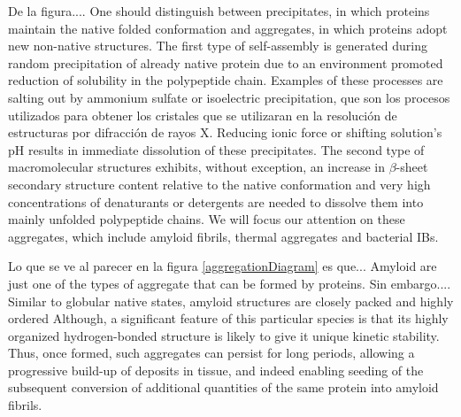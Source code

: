 De la figura....
One should distinguish between precipitates, in which proteins maintain the native folded conformation and aggregates, in which proteins adopt new non-native structures. 
The first type of self-assembly is generated during random precipitation of already native protein due to an environment promoted reduction of solubility in the polypeptide chain. 
Examples of these processes are salting out by ammonium sulfate or isoelectric precipitation, que son los procesos utilizados para obtener los cristales que se utilizaran en la resolución de estructuras por difracción de rayos X. 
Reducing ionic force or shifting solution's pH results in immediate dissolution of these precipitates. 
The second type of macromolecular structures exhibits, without exception, an increase in $\beta$-sheet secondary structure content relative to the native conformation and
very high concentrations of denaturants or detergents are needed to dissolve them into mainly unfolded polypeptide chains. 
We will focus our attention on these aggregates, which include amyloid fibrils, thermal aggregates and bacterial IBs. 








Lo que se ve al parecer en la figura \ref{aggregationDiagram} es que...
Amyloid are just one of the types of aggregate that
can be formed by proteins.
Sin embargo....
Similar to globular native states, amyloid structures are closely packed and highly ordered
Although, a significant feature of this particular species is that its highly organized hydrogen-bonded structure is likely to give it unique kinetic stability. 
Thus, once formed, such aggregates can persist for long periods, allowing a progressive build-up of deposits in tissue, and indeed enabling seeding of the subsequent conversion of additional quantities of the same protein
into amyloid fibrils.




